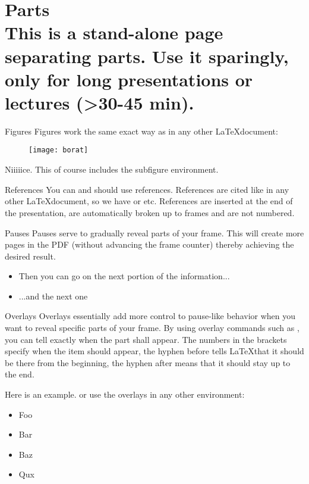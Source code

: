\documentclass{beamer}                              %
\begin{document}
\part{{\bf Parts} \protect\\ This is a stand-alone page separating parts. Use it sparingly, only for long presentations or lectures (>30-45 min).}
\frame{\partpage}

\begin{frame}{Figures}
Figures work the same exact way as in any other \LaTeX document:
\begin{figure}
\centering
  \texttt{[image: borat]}\\
\end{figure}
Niiiiice. This of course includes the subfigure environment.
\end{frame}

\begin{frame}{References}
You can and should use references. References are cited like in any other \LaTeX document, so we have \cite{Takacs2016b} or \cite{Asato2015,Stark2013} etc. References are inserted at the end of the presentation, are automatically broken up to frames and are not numbered.
\end{frame}

\begin{frame}{Pauses}
Pauses serve to gradually reveal parts of your frame. This will create more pages in the PDF (without advancing the frame counter) thereby achieving the desired result.
\pause
\begin{itemize}
\item Then you can go on the next portion of the information...
\pause
\item ...and the next one
\end{itemize}
\end{frame}

\begin{frame}{Overlays}
Overlays essentially add more control to pause-like behavior when you want to reveal specific parts of your frame. By using overlay commands such as , you can tell exactly when the part shall appear. The numbers in the brackets specify when the item should appear, the hyphen before tells \LaTeX that it should be there from the beginning, the hyphen after means that it should stay up to the end.

Here is an example.    or use the overlays in any other environment:

\begin{itemize}
\item<1-> Foo
\item<3-> Bar
\item<-2> Baz
\item<1,4> Qux
\end{itemize}
\end{frame}
\end{document}
